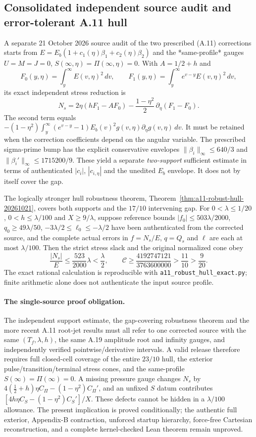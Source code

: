 \subsection*{Consolidated independent source audit and error-tolerant A.11 hull}
\label{subsec:a11-consolidated-independent-20261021}
A separate 21 October 2026 source audit of the two prescribed
(A.11) corrections starts from $E=E_b(1+c_1(\eta)\beta_1+
c_2(\eta)\beta_2)$ and the *same-profile* gauges
$U=M=J=0$, $S(\infty,\eta)=\Pi(\infty,\eta)=0$.
With $A=1/2+h$ and
\[
 F_0(y,\eta)=\int_y^\infty E(v,\eta)^2\,dv,\qquad
 F_1(y,\eta)=\int_y^\infty e^{v-y}E(v,\eta)^2\,dv ,
\]
its exact independent stress reduction is
\[
N_s=2\eta(hF_1-AF_0)
-\frac{1-\eta^2}{2}\,\partial_\eta(F_1-F_0).
\]
The second term equals
$-(1-\eta^2)\int_y^\infty(e^{v-y}-1)
E_b(v)^2g(v,\eta)\partial_\eta g(v,\eta)\,dv$.
It must be retained when the correction coefficients depend
on the angular variable. The prescribed sigma-prime bump has
the explicit conservative envelopes
$\|\beta_i\|_\infty\le640/3$ and
$\|\beta_i'\|_\infty\le1715200/9$.
These yield a separate \emph{two-support} sufficient estimate
in terms of authenticated $|c_i|$, $|c_{i,\eta}|$ and the
unedited $E_b$ envelope. It does not by itself cover the gap.

The logically stronger hull robustness theorem,
Theorem~\ref{thm:a11-robust-hull-20261021},
covers both supports and the $17/10$ intervening gap.
For $0<\lambda\le1/20$, $0<h\le\lambda/100$ and
$X\ge9/\lambda$, suppose reference bounds
$|f_0|\le503\lambda/2000$, $q_0\ge49\lambda/50$,
$-3\lambda/2\le\ell_0\le-\lambda/2$ have been authenticated
from the corrected source, and the complete actual errors in
$f=N_s/E$, $q=Q_s$ and $\ell$ are each at most $\lambda/100$.
Then the strict stress slack and the original normalized cone obey
\[
\frac{|N_s|}{E}\le\frac{523}{2000}\lambda<\frac\lambda2,
\qquad
\mathcal C\ge\frac{4192747121}{3763600000}>
\frac{11}{10}>\frac9{20}.
\]
The exact rational calculation is reproducible with
\texttt{a11\_robust\_hull\_exact.py}; finite arithmetic alone
does not authenticate the input source profile.

\paragraph{The single-source proof obligation.}
The independent support estimate, the gap-covering robustness
theorem and the more recent A.11 root-jet results must all refer
to one corrected source with the same $(T_f,\lambda,h)$, the same
A.19 amplitude root and infinity gauges, and independently
verified pointwise/derivative intervals. A valid release therefore
requires full closed-cell coverage of the entire $23/10$ hull,
the exterior pulse/transition/terminal stress cones, and
the same-profile $S(\infty)=\Pi(\infty)=0$.
A missing pressure gauge changes $N_s$ by
$4(\frac12+h)\eta C_\Pi-(1-\eta^2)C_\Pi'$, and an unfixed
$S$ datum contributes
$[4h\eta C_S-(1-\eta^2)C_S']/X$.
These defects cannot be hidden in a $\lambda/100$ allowance.
The present implication is proved conditionally; the
authentic full exterior, Appendix-B contraction, unforced
startup hierarchy, force-free Cartesian reconstruction, and a
complete kernel-checked Lean theorem remain unproved.